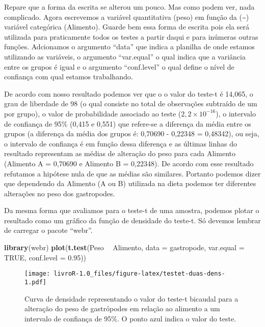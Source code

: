 \documentclass[titlepage, oneside, openany, a4paper]{book}
\newenvironment{Shaded}{\begin{snugshade}}{\end{snugshade}}
\newcommand{\DataTypeTok}[1]{\textcolor[rgb]{0.13,0.29,0.53}{#1}}
\newcommand{\FloatTok}[1]{\textcolor[rgb]{0.00,0.00,0.81}{#1}}
\newcommand{\KeywordTok}[1]{\textcolor[rgb]{0.13,0.29,0.53}{\textbf{#1}}}
\newcommand{\NormalTok}[1]{#1}
\newcommand{\OperatorTok}[1]{\textcolor[rgb]{0.81,0.36,0.00}{\textbf{#1}}}
\newcommand{\OtherTok}[1]{\textcolor[rgb]{0.56,0.35,0.01}{#1}}
\newcommand{\StringTok}[1]{\textcolor[rgb]{0.31,0.60,0.02}{#1}}
\begin{document}
Repare que a forma da escrita se alterou um pouco. Mas como podem ver, nada complicado. Agora escrevemos a variável quantitativa (peso) em função da (\textasciitilde{}) variável categórica (Alimento). Guarde bem essa forma de escrita pois ela será utilizada para praticamente todos os testes a partir daqui e para inúmeras outras funções. Adcionamos o argumento ``data'' que indica a planilha de onde estamos utilizando as variáveis, o argumento ``var.equal'' o qual indica que a variância entre os grupos é igual e o argumento ``conf.level'' o qual define o nível de confiança com qual estamos trabalhando.

De acordo com nosso resultado podemos ver que o o valor do teste-t é 14,065, o grau de liberdade de 98 (o qual consiste no total de observações subtraído de um por grupo), o valor de probabilidade associado ao teste (\(2,2\times10^{-16}\)), o intervalo de confiança de 95\% (0,415 e 0,551) que refere-se a diferença da média entre os grupos (a diferença da média dos grupos é: 0,70690 - 0,22348 = 0,48342), ou seja, o intervalo de confiança é em função dessa diferença e as últimas linhas do resultado representam as médias de alteração do peso para cada Alimento (Alimento A = 0,70690 e Alimento B = 0,22348). De acordo com esse resultado refutamos a hipótese nula de que as médias são similares. Portanto podemos dizer que dependendo da Alimento (A ou B) utilizada na dieta podemos ter diferentes alterações no peso dos gastropodes.

Da mesma forma que avaliamos para o teste-t de uma amostra, podemos plotar o resultado como um gráfico da função de densidade do teste-t. Só devemos lembrar de carregar o pacote ``webr''.

\begin{Shaded}
\begin{Highlighting}[]
\KeywordTok{library}\NormalTok{(webr)}
\KeywordTok{plot}\NormalTok{(}\KeywordTok{t.test}\NormalTok{(Peso }\OperatorTok{~}\StringTok{ }\NormalTok{Alimento, }
            \DataTypeTok{data =}\NormalTok{ gastropode,}
            \DataTypeTok{var.equal =} \OtherTok{TRUE}\NormalTok{,}
            \DataTypeTok{conf.level =} \FloatTok{0.95}\NormalTok{))}
\end{Highlighting}
\end{Shaded}

\begin{figure}
\centering
\texttt{[image: livroR-1.0\_files/figure-latex/testet-duas-dens-1.pdf]}
\caption{\label{fig:testet-duas-dens}Curva de densidade representando o valor do teste-t bicaudal para a alteração do peso de gastrópodes em relação ao alimento a um intervalo de confiança de 95\%. O ponto azul indica o valor do teste.}
\end{figure}
\end{document}

